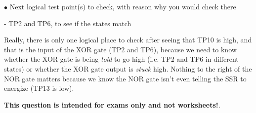 \medskip
\goodbreak
\item{$\bullet$} Next logical test point(s) to check, with reason why you would check there
\item{-} TP2 and TP6, to see if the states match
\medskip

Really, there is only one logical place to check after seeing that TP10 is high, and that is the input of the XOR gate (TP2 and TP6), because we need to know whether the XOR gate is being {\it told} to go high (i.e. TP2 and TP6 in different states) or whether the XOR gate output is {\it stuck} high.  Nothing to the right of the NOR gate matters because we know the NOR gate isn't even telling the SSR to energize (TP13 is low).







{\bf This question is intended for exams only and not worksheets!}.




